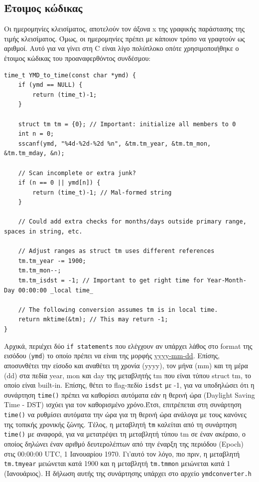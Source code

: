 \documentclass[a4paper, 14pt]{article}   %
\begin{document}
\subsection*{Έτοιμος κώδικας}   %
	Οι ημερομηνίες κλεισίματος, αποτελούν τον άξονα x της γραφικής παράστασης της τιμής κλεισίματος. Όμως, οι ημερομηνίες πρέπει με κάποιον τρόπο να γραφτούν ως αριθμοί. Αυτό για να γίνει στη C είναι λίγο πολύπλοκο οπότε χρησιμοποιήθηκε ο έτοιμος κώδικας του προαναφερθόντος συνδέσμου:
\begin{lstlisting}
time_t YMD_to_time(const char *ymd) {
    if (ymd == NULL) {
        return (time_t)-1;
    }

    struct tm tm = {0}; // Important: initialize all members to 0
    int n = 0;
    sscanf(ymd, "%4d-%2d-%2d %n", &tm.tm_year, &tm.tm_mon, &tm.tm_mday, &n);

    // Scan incomplete or extra junk?
    if (n == 0 || ymd[n]) {
        return (time_t)-1; // Mal-formed string
    }

    // Could add extra checks for months/days outside primary range, spaces in string, etc.

    // Adjust ranges as struct tm uses different references
    tm.tm_year -= 1900;
    tm.tm_mon--;
    tm.tm_isdst = -1; // Important to get right time for Year-Month-Day 00:00:00 _local time_

    // The following conversion assumes tm is in local time.
    return mktime(&tm); // This may return -1;
}
\end{lstlisting}
Αρχικά, περιέχει δύο \texttt{if statements} που ελέγχουν αν υπάρχει λάθος στο format της εισόδου (\texttt{ymd}) το οποίο πρέπει να είναι της μορφής \underline{yyyy-mm-dd}. Επίσης, αποσυνθέτει την είσοδο και αναθέτει τη χρονία (yyyy), τον μήνα (mm) και τη μέρα (dd) στα πεδία year, mon και day της μεταβλητής tm που είναι τύπου struct tm, το οποίο είναι built-in. Επίσης, θέτει  το flag-πεδίο \texttt{isdst} με -1, για να υποδηλώσει ότι η συνάρτηση \texttt{time()} πρέπει να καθορίσει αυτόματα εάν η θερινή ώρα (Daylight Saving Time - DST) ισχύει για τον καθορισμένο χρόνο.Έτσι, επιτρέπεται στη συνάρτηση \texttt{time()} να ρυθμίσει αυτόματα την ώρα για τη θερινή ώρα ανάλογα με τους κανόνες της τοπικής χρονικής ζώνης. Τέλος, η μεταβλητή \texttt{tm} καλείται από τη συνάρτηση \texttt{time()} με αναφορά, για να μετατρέψει τη μεταβλητή τύπου tm σε έναν ακέραιο, ο οποίος δηλώνει έναν αριθμό δευτερολέπτων από την έναρξη της περιόδου (Epoch) στις 00:00:00 UTC, 1 Ιανουαρίου 1970. Γι'αυτό τον λόγο, πιο πριν, η μεταβλητή \texttt{ tm.tm\textunderscore year} μειώνεται κατά 1900 και η μεταβλητή \texttt{tm.tm\textunderscore mon} μειώνεται κατά 1 (Ιανουάριος). Η δήλωση αυτής της συνάρτησης υπάρχει στο αρχείο \texttt{ymd\textunderscore converter.h}
\end{document}
